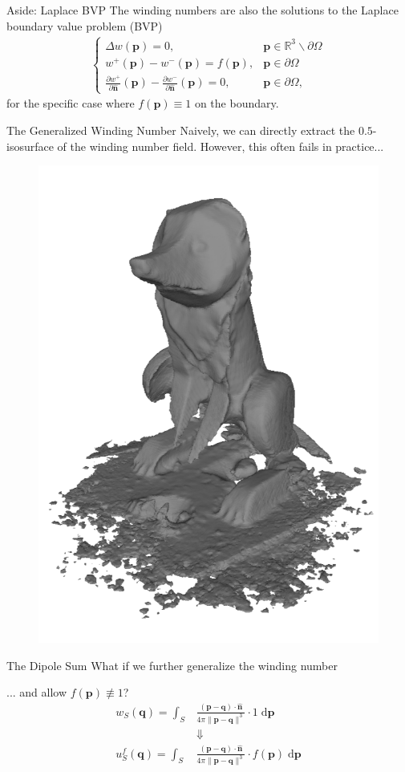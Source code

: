 \documentclass[10pt]{beamer}
\newcommand{\bp}{\mathbf{p}}
\newcommand{\bq}{\mathbf{q}}
\newcommand{\bn}{\mathbf{n}}
\begin{document}
\begin{frame}{\alert{Aside}: Laplace BVP}
    The winding numbers are also the solutions to the Laplace boundary value problem (BVP)
    \begin{align*}
    \begin{cases}
        \Delta w(\bp) = 0, & \bp \in {\mathbb R}^3 \backslash \partial \Omega \\
        w^+(\bp) - w^-(\bp) = f(\bp), & \bp \in \partial \Omega \\
        \frac{\partial w^+}{\partial \widehat{\bn}}(\bp) - \frac{\partial w^-}{\partial \widehat{\bn}}(\bp) = 0, & \bp \in  \partial \Omega,
    \end{cases}
    \end{align*}
    for the specific case where \(f(\bp) \equiv 1\) on the boundary.
\end{frame}

\begin{frame}{The \alert{Generalized} Winding Number}
    Naively, we can directly extract the \(0.5\)-isosurface of the winding number field. However, this often fails in practice...
    \vspace{-1em}
    \begin{figure}
        \centering
        \includegraphics[width=0.45\linewidth]{figures/wn/gwn_mesh.png}
    \end{figure}
\end{frame}

\begin{frame}{The Dipole Sum}
    What if we further generalize the winding number
    
    ... and allow \(f(\bp) \not\equiv 1\)?
    \begin{align*}
        w_S(\bq) = \int_{S} &\frac{(\bp - \bq) \cdot \widehat{\bn}}{4\pi \|\bp - \bq\|^3} \cdot 1 \;\mathrm{d}\bp \\
        &\Downarrow \\
        u^f_S(\bq) = \int_{S} & \frac{(\bp - \bq) \cdot \widehat{\bn}}{4\pi \|\bp - \bq\|^3} \cdot f(\bp) \;\mathrm{d}\bp
    \end{align*}
\end{frame}
\end{document}
